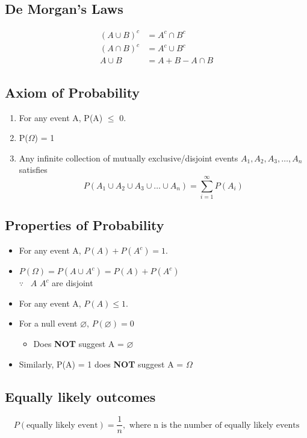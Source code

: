\documentclass[a4paper]{article}
\begin{document}
\subsection{De Morgan's Laws}
\begin{align*}
    (A\cup B)^{c} &= A^{c} \cap B^{c}\\
    (A\cap B)^{c} &= A^{c} \cup B^{c}\\
    A \cup B &= A+B-A\cap B
\end{align*}
\subsection{Axiom of Probability}
\begin{enumerate}
    \item For any event A, P(A) $\leq$ 0.
    \item P($\Omega$) = 1
    \item Any infinite collection of mutually exclusive/disjoint events $A_{1}, A_{2}, A_{3}, \ldots, A_{n}$ satisfies
    $$P(A_{1}\cup A_{2}\cup A_{3} \cup \ldots \cup A_{n}) = \sum_{i=1}^{\infty}P(A_{i})$$
\end{enumerate}
\subsection{Properties of Probability}
\begin{itemize}
    \item For any event A, $P(A) + P(A^c) = 1$.
    \item $P(\Omega) = P(A\cup A^c) = P(A) + P(A^c)$\\
    $\because$ \ $A$  $A^c$ are disjoint
    \item For any event A, $P(A) \leq 1$.
    \item For a null event $\varnothing$, $P(\varnothing) = 0$
    \begin{itemize}[label=$\circ$]
        \item Does \textbf{NOT} suggest A = $\varnothing$
    \end{itemize}
    \item Similarly, P(A) = 1 does \textbf{NOT} suggest A = $\Omega$
\end{itemize}
\subsection{Equally likely outcomes}
$$P(\text{equally likely event}) = \frac{1}{n},\text{ where n is the number of equally likely events}$$
\newpage
\end{document}

